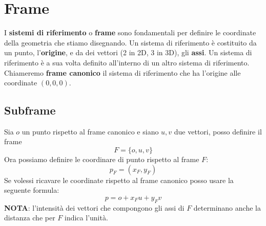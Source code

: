 \chapter{Frame}\label{frame}
I \textbf{sistemi di riferimento} o \textbf{frame} sono fondamentali per definire le coordinate
della geometria che stiamo disegnando. Un sistema di riferimento \`e costituito da un punto,
l'\textbf{origine}, e da dei vettori (2 in 2D, 3 in 3D), gli \textbf{assi}.
Un sistema di riferimento \`e a sua volta definito all'interno di un altro sistema di
riferimento. Chiameremo \textbf{frame canonico} il sistema di riferimento che
ha l'origine alle coordinate $(0, 0, 0)$.

\section{Subframe}
Sia $o$ un punto rispetto al frame canonico e siano $u, v$ due vettori, posso definire il frame
\[ F = \{ o, u, v \} \]
Ora possiamo definire le coordinare di punto rispetto al frame $F$:
\[ p_F = (x_F, y_F) \]
Se volessi ricavare le coordinate rispetto al frame canonico posso usare la seguente formula:
\[ p = o + x_Fu + y_Fv \]
\textbf{NOTA}: l'intensit\`a dei vettori che compongono gli assi di $F$ determinano anche
la distanza che per $F$ indica l'unit\`a.

